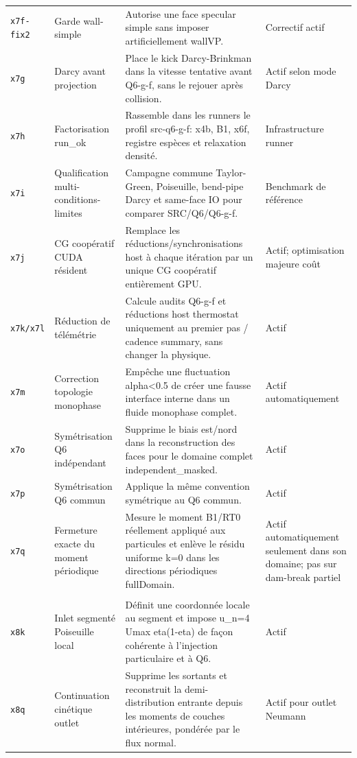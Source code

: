 \documentclass[a4paper,9pt]{article}
\begin{document}
\begin{landscape}
\begin{longtable}{L{2.35cm} L{5.3cm} L{13.25cm} L{4.75cm}}
\texttt{x7f-fix2} & Garde wall-simple & Autorise une face specular simple sans imposer artificiellement wallVP. & Correctif actif \\
\texttt{x7g} & Darcy avant projection & Place le kick Darcy-Brinkman dans la vitesse tentative avant Q6-g-f, sans le rejouer après collision. & Actif selon mode Darcy \\
\texttt{x7h} & Factorisation run\_ok & Rassemble dans les runners le profil src-q6-g-f: x4b, B1, x6f, registre espèces et relaxation densité. & Infrastructure runner \\
\texttt{x7i} & Qualification multi-conditions-limites & Campagne commune Taylor-Green, Poiseuille, bend-pipe Darcy et same-face IO pour comparer SRC/Q6/Q6-g-f. & Benchmark de référence \\
\texttt{x7j} & CG coopératif CUDA résident & Remplace les réductions/synchronisations host à chaque itération par un unique CG coopératif entièrement GPU. & Actif; optimisation majeure coût \\
\texttt{x7k/x7l} & Réduction de télémétrie & Calcule audits Q6-g-f et réductions host thermostat uniquement au premier pas / cadence summary, sans changer la physique. & Actif \\
\texttt{x7m} & Correction topologie monophase & Empêche une fluctuation alpha<0.5 de créer une fausse interface interne dans un fluide monophase complet. & Actif automatiquement \\
\texttt{x7o} & Symétrisation Q6 indépendant & Supprime le biais est/nord dans la reconstruction des faces pour le domaine complet independent\_masked. & Actif \\
\texttt{x7p} & Symétrisation Q6 commun & Applique la même convention symétrique au Q6 commun. & Actif \\
\texttt{x7q} & Fermeture exacte du moment périodique & Mesure le moment B1/RT0 réellement appliqué aux particules et enlève le résidu uniforme k=0 dans les directions périodiques fullDomain. & Actif automatiquement seulement dans son domaine; pas sur dam-break partiel \\
\\
\texttt{x8k} & Inlet segmenté Poiseuille local & Définit une coordonnée locale au segment et impose u\_n=4 Umax eta(1-eta) de façon cohérente à l'injection particulaire et à Q6. & Actif \\
\texttt{x8q} & Continuation cinétique outlet & Supprime les sortants et reconstruit la demi-distribution entrante depuis les moments de couches intérieures, pondérée par le flux normal. & Actif pour outlet Neumann \\

\end{longtable}
\end{landscape}
\end{document}
